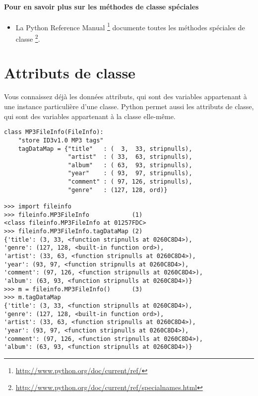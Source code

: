 \paragraph{Pour en savoir plus sur les méthodes de classe spéciales}
\begin{itemize}
  \item La Python Reference Manual  \footnote{\url{http://www.python.org/doc/current/ref/}} documente toutes les méthodes spéciales de classe  \footnote{\url{http://www.python.org/doc/current/ref/specialnames.html}}.
\end{itemize}


\section{Attributs de classe}

Vous connaissez déjà les données attributs, qui sont des variables appartenant à une instance particulière d'une classe. Python permet aussi les attributs de classe, qui sont des variables appartenant à la classe elle-même.

\begin{example}
\begin{lstlisting}
class MP3FileInfo(FileInfo):
    "store ID3v1.0 MP3 tags"
    tagDataMap = {"title"   : (  3,  33, stripnulls),
                  "artist"  : ( 33,  63, stripnulls),
                  "album"   : ( 63,  93, stripnulls),
                  "year"    : ( 93,  97, stripnulls),
                  "comment" : ( 97, 126, stripnulls),
                  "genre"   : (127, 128, ord)}

>>> import fileinfo
>>> fileinfo.MP3FileInfo            (1)
<class fileinfo.MP3FileInfo at 01257FDC>
>>> fileinfo.MP3FileInfo.tagDataMap (2)
{'title': (3, 33, <function stripnulls at 0260C8D4>),
'genre': (127, 128, <built-in function ord>),
'artist': (33, 63, <function stripnulls at 0260C8D4>),
'year': (93, 97, <function stripnulls at 0260C8D4>),
'comment': (97, 126, <function stripnulls at 0260C8D4>),
'album': (63, 93, <function stripnulls at 0260C8D4>)}
>>> m = fileinfo.MP3FileInfo()      (3)
>>> m.tagDataMap
{'title': (3, 33, <function stripnulls at 0260C8D4>),
'genre': (127, 128, <built-in function ord>),
'artist': (33, 63, <function stripnulls at 0260C8D4>),
'year': (93, 97, <function stripnulls at 0260C8D4>),
'comment': (97, 126, <function stripnulls at 0260C8D4>),
'album': (63, 93, <function stripnulls at 0260C8D4>)}
\end{lstlisting}
\end{example}


